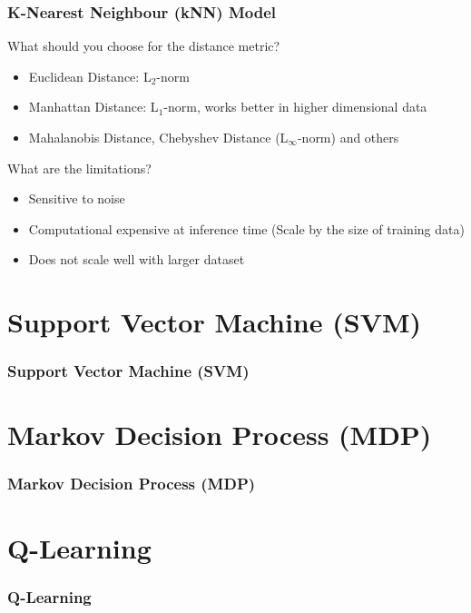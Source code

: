\documentclass[aspectratio=169, 10pt]{beamer}
\begin{document}
\begin{frame}[t]
    \frametitle{K-Nearest Neighbour (kNN) Model}

    What should you choose for the distance metric?
    \pause
    \begin{itemize}
        \item Euclidean Distance: L$_2$-norm
        \item Manhattan Distance: L$_1$-norm, works better in higher dimensional data
        \item Mahalanobis Distance, Chebyshev Distance (L$_\infty$-norm) and others
    \end{itemize}

    \vspace{1em}
    What are the limitations?
    \pause
    \begin{itemize}
        \item Sensitive to noise
        \item Computational expensive at inference time (Scale by the size of training data)
        \item Does not scale well with larger dataset
    \end{itemize}

\end{frame}

\section{Support Vector Machine (SVM)}
\begin{frame}[t]
\frametitle{Support Vector Machine (SVM)}


\end{frame}

\section{Markov Decision Process (MDP)}
\begin{frame}[t]
\frametitle{Markov Decision Process (MDP)}


\end{frame}

\section{Q-Learning}
\begin{frame}[t]
\frametitle{Q-Learning}


\end{frame}
\end{document}
